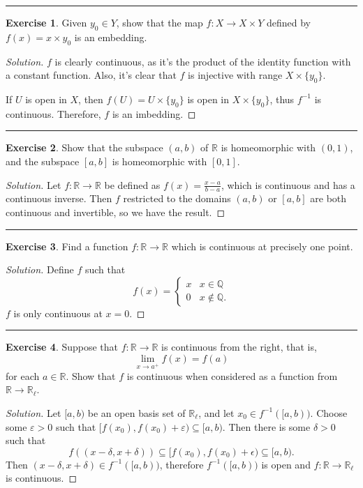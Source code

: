 \documentclass{article}
\theoremstyle{definition}
\newtheorem{exercise}{Exercise}[section]
\begin{document}
\hrule

\begin{exercise}
  Given $y_0\in Y$, show that the map $f:X\to X\times Y$ defined by $f(x) = x\times y_0$ is an embedding.
\end{exercise}
\begin{proof}[Solution]
  $f$ is clearly continuous, as it's the product of the identity function with a constant function. Also, it's clear that $f$ is injective with range $X\times\{y_0\}$.

  If $U$ is open in $X$, then $f(U) = U\times \{y_0\}$ is open in $X\times\{y_0\}$, thus $f^{-1}$ is continuous. Therefore, $f$ is an imbedding.
\end{proof}

\hrule

\begin{exercise}
  Show that the subspace $(a,b)$ of $\mathbb{R}$ is homeomorphic with $(0,1)$, and the subspace $[a,b]$ is homeomorphic with $[0,1]$.
\end{exercise}
\begin{proof}[Solution]
  Let $f:\mathbb{R}\to\mathbb{R}$ be defined as $f(x) = \frac{x-a}{b-a}$, which is continuous and has a continuous inverse. Then $f$ restricted to the domains $(a,b)$ or $[a,b]$ are both continuous and invertible, so we have the result.
\end{proof}

\hrule

\begin{exercise}
  Find a function $f:\mathbb{R}\to\mathbb{R}$ which is continuous at precisely one point.
\end{exercise}
\begin{proof}[Solution]
  Define $f$ such that $$f(x) = \begin{cases}
    x & x\in\mathbb{Q} \\
    0 & x\notin\mathbb{Q}.
  \end{cases}$$
  $f$ is only continuous at $x = 0$.
\end{proof}

\hrule

\begin{exercise}
  Suppose that $f:\mathbb{R}\to\mathbb{R}$ is continuous from the right, that is,
  $$\lim_{x\to a^+} f(x) = f(a)$$
  for each $a\in\mathbb{R}$. Show that $f$ is continuous when considered as a function from $\mathbb{R}\to\mathbb{R}_\ell$.
\end{exercise}
\begin{proof}[Solution]
  Let $[a,b)$ be an open basis set of $\mathbb{R}_\ell$, and let $x_0\in f^{-1}([a,b))$. Choose some $\varepsilon > 0$ such that $[f(x_0),f(x_0)+\varepsilon)\subseteq [a,b)$. Then there is some $\delta > 0$ such that
  $$f((x-\delta, x+\delta)) \subseteq [f(x_0),f(x_0) + \epsilon) \subseteq [a,b).$$
  Then $(x-\delta, x+\delta) \in f^{-1}([a,b))$, therefore $f^{-1}([a,b))$ is open and $f:\mathbb{R}\to\mathbb{R}_\ell$ is continuous.
\end{proof}
\end{document}
